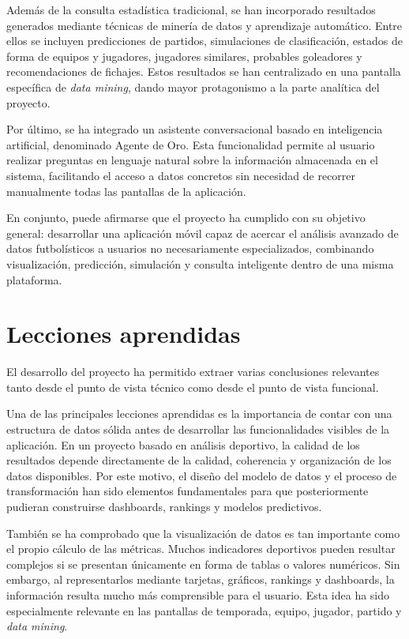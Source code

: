 Además de la consulta estadística tradicional, se han incorporado resultados generados mediante técnicas de minería de datos y aprendizaje automático. Entre ellos se incluyen predicciones de partidos, simulaciones de clasificación, estados de forma de equipos y jugadores, jugadores similares, probables goleadores y recomendaciones de fichajes. Estos resultados se han centralizado en una pantalla específica de \textit{data mining}, dando mayor protagonismo a la parte analítica del proyecto.

Por último, se ha integrado un asistente conversacional basado en inteligencia artificial, denominado Agente de Oro. Esta funcionalidad permite al usuario realizar preguntas en lenguaje natural sobre la información almacenada en el sistema, facilitando el acceso a datos concretos sin necesidad de recorrer manualmente todas las pantallas de la aplicación.

En conjunto, puede afirmarse que el proyecto ha cumplido con su objetivo general: desarrollar una aplicación móvil capaz de acercar el análisis avanzado de datos futbolísticos a usuarios no necesariamente especializados, combinando visualización, predicción, simulación y consulta inteligente dentro de una misma plataforma.

\section{Lecciones aprendidas}

El desarrollo del proyecto ha permitido extraer varias conclusiones relevantes tanto desde el punto de vista técnico como desde el punto de vista funcional.

Una de las principales lecciones aprendidas es la importancia de contar con una estructura de datos sólida antes de desarrollar las funcionalidades visibles de la aplicación. En un proyecto basado en análisis deportivo, la calidad de los resultados depende directamente de la calidad, coherencia y organización de los datos disponibles. Por este motivo, el diseño del modelo de datos y el proceso de transformación han sido elementos fundamentales para que posteriormente pudieran construirse dashboards, rankings y modelos predictivos.

También se ha comprobado que la visualización de datos es tan importante como el propio cálculo de las métricas. Muchos indicadores deportivos pueden resultar complejos si se presentan únicamente en forma de tablas o valores numéricos. Sin embargo, al representarlos mediante tarjetas, gráficos, rankings y dashboards, la información resulta mucho más comprensible para el usuario. Esta idea ha sido especialmente relevante en las pantallas de temporada, equipo, jugador, partido y \textit{data mining}.

